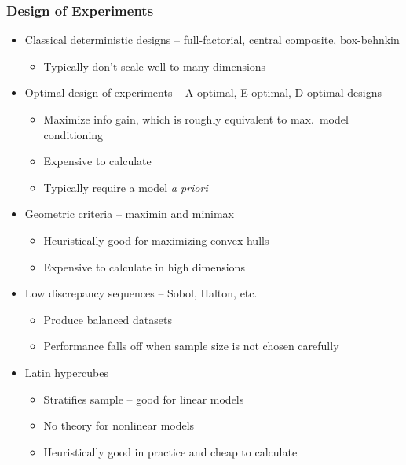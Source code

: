 \documentclass[aspectratio=169]{beamer}
\begin{document}
\begin{frame}\frametitle{Design of Experiments}

\begin{itemize}
\pause \item Classical deterministic designs -- full-factorial, central composite, box-behnkin
\begin{itemize}
\item Typically don't scale well to many dimensions
\end{itemize}
\pause \item Optimal design of experiments -- A-optimal, E-optimal, D-optimal designs
\begin{itemize}
\item Maximize info gain, which is roughly equivalent to max.~model conditioning
\item Expensive to calculate
\item Typically require a model {\sl a priori}
\end{itemize}
\pause \item Geometric criteria -- maximin and minimax
\begin{itemize}
\item Heuristically good for maximizing convex hulls
\item Expensive to calculate in high dimensions
\end{itemize}
\pause \item Low discrepancy sequences -- Sobol, Halton, etc.
\begin{itemize}
\item Produce balanced datasets
\item Performance falls off when sample size is not chosen carefully
\end{itemize}
\pause \item Latin hypercubes
\begin{itemize}
\item Stratifies sample -- good for linear models
\item No theory for nonlinear models
\item Heuristically good in practice and cheap to calculate
\end{itemize}
\end{itemize}
\end{frame}
\end{document}
